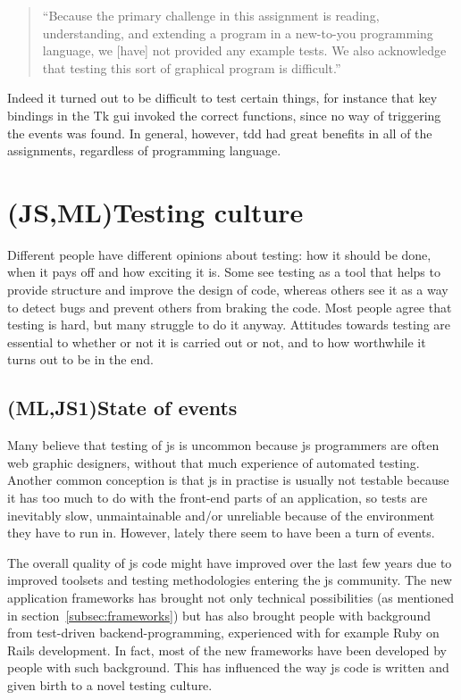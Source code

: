\documentclass[11pt]{article}
\begin{document}
\begin{quote}
``Because the primary challenge in this assignment is reading, understanding, and extending a program in a new-to-you programming language, we [have] not provided any example tests. We also acknowledge that testing this sort of graphical program is difficult.''
\end{quote}

Indeed it turned out to be difficult to test certain things, for instance that key bindings in the Tk \gls{gui} invoked the correct functions, since no way of triggering the events was found.
In general, however, \gls{tdd} had great benefits in all of the assignments, regardless of programming language.


\section{(JS,ML)Testing culture}
\label{sec:testingculture}

Different people have different opinions about testing: how it should be done, when it pays off and how exciting it is. Some see testing as a tool that helps to provide structure and improve the design of code, whereas others see it as a way to detect bugs and prevent others from braking the code. Most people agree that testing is hard, but many struggle to do it anyway. Attitudes towards testing are essential to whether or not it is carried out or not, and to how worthwhile it turns out to be in the end.

\subsection{(ML,JS1)State of events}
\label{subsec:stateofevents}

Many believe that testing of \gls{js} is uncommon because \gls{js} programmers are often web graphic designers, without that much experience of automated testing. Another common conception is that \gls{js} in practise is usually not testable because it has too much to do with the front-end parts of an application, so tests are inevitably slow, unmaintainable and/or unreliable because of the environment they have to run in. However, lately there seem to have been a turn of events.

The overall quality of \gls{js} code might have improved over the last few years due to improved toolsets and testing methodologies entering the \gls{js} community. The new application frameworks has brought not only technical possibilities (as mentioned in section~\ref{subsec:frameworks}) but has also brought people with background from test-driven backend-programming, experienced with for example Ruby on Rails development. In fact, most of the new frameworks have been developed by people with such background. This has influenced the way \gls{js} code is written and given birth to a novel testing culture. \cite[questions~12-15]{Ahnve}
\end{document}
